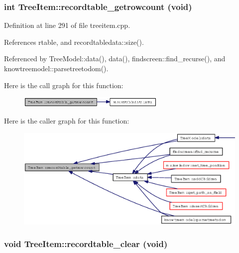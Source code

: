 \subsubsection{\setlength{\rightskip}{0pt plus 5cm}int Tree\-Item::recordtable\_\-getrowcount (void)}\label{classTreeItem_f736d45c591daa6e3a00da91a61c593b}




Definition at line 291 of file treeitem.cpp.

References rtable, and recordtabledata::size().

Referenced by Tree\-Model::data(), data(), findscreen::find\_\-recurse(), and knowtreemodel::parsetreetodom().

Here is the call graph for this function:\begin{figure}[H]
\begin{center}
\leavevmode
\includegraphics[width=200pt]{classTreeItem_f736d45c591daa6e3a00da91a61c593b_cgraph}
\end{center}
\end{figure}


Here is the caller graph for this function:\begin{figure}[H]
\begin{center}
\leavevmode
\includegraphics[width=370pt]{classTreeItem_f736d45c591daa6e3a00da91a61c593b_icgraph}
\end{center}
\end{figure}
\subsubsection{\setlength{\rightskip}{0pt plus 5cm}void Tree\-Item::recordtable\_\-clear (void)}\label{classTreeItem_409019fbc34a4e4bb315904d72ba44ce}




